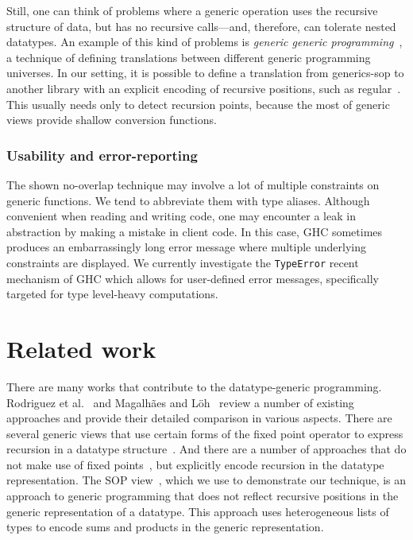 \documentclass[runningheads]{llncs}
\newcommand{\K}[1]{\lstinline{#1}}
\begin{document}
Still, one can think of problems where a generic operation uses the recursive structure of data, but has no recursive calls---and, therefore, can tolerate nested datatypes. An example of this kind of problems is \emph{generic generic programming}~\cite{MagLoeh2014}, a technique of defining translations between different generic programming universes. In our setting, it is possible to define a translation from \textsf{generics-sop} to another library with an explicit encoding of recursive positions, such as \textsf{regular}~\cite{VanNoort2008}. This usually needs only to detect recursion points, because the most of generic views provide shallow conversion functions.

\subsubsection{Usability and error-reporting}

The shown no-overlap technique may involve a lot of multiple constraints on generic functions. We tend to abbreviate them with type aliases. Although convenient when reading and writing code, one may encounter a leak in abstraction by making a mistake in client code. In this case, GHC sometimes produces an embarrassingly long error message where multiple underlying constraints are displayed. We currently investigate the \K{TypeError} recent mechanism of GHC which allows for user-defined error messages, specifically targeted for type level-heavy computations.

\section{Related work}
\label{sec:related-work}

There are many works that contribute to the datatype-generic programming. Rodriguez et al.~\cite{Rodriguez2008} and Magalh{\~{a}}es and L{\"{o}}h~\cite{MagLoeh2012} review a number of existing approaches and provide their detailed comparison in various aspects. There are several generic views that use certain forms of the fixed point operator to express recursion in a datatype structure~\cite{VanNoort2008,MuRec2009,Jansson1997,Loeh2011}. And there are a number of approaches that do not make use of fixed points~\cite{Chakravarty2009,Cheney2002,Magalhaes2010,Weirich2006}, but explicitly encode recursion in the datatype representation. The SOP view~\cite{VriLoeh2014}, which we use to demonstrate our technique, is an approach to generic programming that does not reflect recursive positions in the generic representation of a datatype. This approach uses heterogeneous lists of types to encode sums and products in the generic representation.
\end{document}
